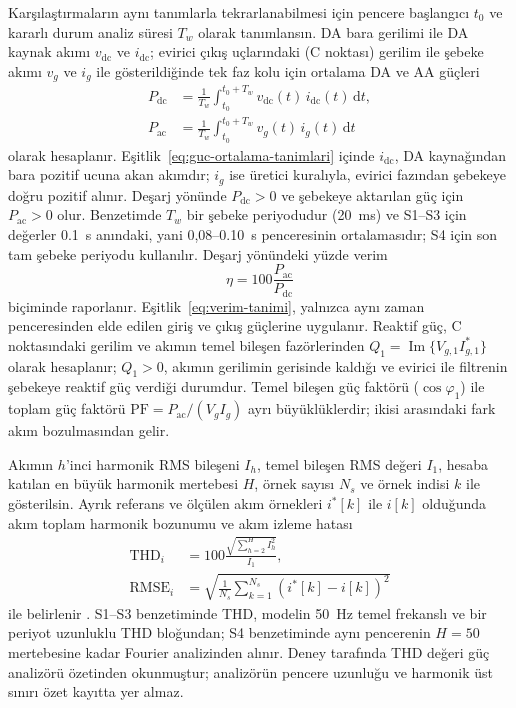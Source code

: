 Karşılaştırmaların aynı tanımlarla tekrarlanabilmesi için pencere başlangıcı $t_0$ ve kararlı durum analiz süresi $T_w$ olarak tanımlansın. DA bara gerilimi ile DA kaynak akımı $v_{\mathrm{dc}}$ ve $i_{\mathrm{dc}}$; evirici çıkış uçlarındaki (C noktası) gerilim ile şebeke akımı $v_g$ ve $i_g$ ile gösterildiğinde tek faz kolu için ortalama DA ve AA güçleri
\begin{equation}
  \begin{aligned}
    P_{\mathrm{dc}} &= \frac{1}{T_w}\int_{t_0}^{t_0+T_w}v_{\mathrm{dc}}(t)\,i_{\mathrm{dc}}(t)\,\mathrm{d}t, \\
    P_{\mathrm{ac}} &= \frac{1}{T_w}\int_{t_0}^{t_0+T_w}v_g(t)\,i_g(t)\,\mathrm{d}t
  \end{aligned}
  \label{eq:guc-ortalama-tanimlari}
\end{equation}
olarak hesaplanır. Eşitlik~\eqref{eq:guc-ortalama-tanimlari} içinde $i_{\mathrm{dc}}$, DA kaynağından bara pozitif ucuna akan akımdır; $i_g$ ise üretici kuralıyla, evirici fazından şebekeye doğru pozitif alınır. Deşarj yönünde $P_{\mathrm{dc}}>0$ ve şebekeye aktarılan güç için $P_{\mathrm{ac}}>0$ olur. Benzetimde $T_w$ bir şebeke periyodudur (\SI{20}{\milli\second}) ve S1--S3 için değerler \SI{0.1}{\second} anındaki, yani 0,08--\SI{0.10}{\second} penceresinin ortalamasıdır; S4 için son tam şebeke periyodu kullanılır. Deşarj yönündeki yüzde verim
\begin{equation}
  \eta=100\frac{P_{\mathrm{ac}}}{P_{\mathrm{dc}}}
  \label{eq:verim-tanimi}
\end{equation}
biçiminde raporlanır. Eşitlik~\eqref{eq:verim-tanimi}, yalnızca aynı zaman penceresinden elde edilen giriş ve çıkış güçlerine uygulanır. Reaktif güç, C noktasındaki gerilim ve akımın temel bileşen fazörlerinden $Q_1=\operatorname{Im}\{V_{g,1}I_{g,1}^{\ast}\}$ olarak hesaplanır; $Q_1>0$, akımın gerilimin gerisinde kaldığı ve evirici ile filtrenin şebekeye reaktif güç verdiği durumdur. Temel bileşen güç faktörü ($\cos\varphi_1$) ile toplam güç faktörü $\mathrm{PF}=P_{\mathrm{ac}}/(V_gI_g)$ ayrı büyüklüklerdir; ikisi arasındaki fark akım bozulmasından gelir.

Akımın $h$'inci harmonik RMS bileşeni $I_h$, temel bileşen RMS değeri $I_1$, hesaba katılan en büyük harmonik mertebesi $H$, örnek sayısı $N_s$ ve örnek indisi $k$ ile gösterilsin. Ayrık referans ve ölçülen akım örnekleri $i^{\ast}[k]$ ile $i[k]$ olduğunda akım toplam harmonik bozunumu ve akım izleme hatası
\begin{equation}
  \begin{aligned}
    \mathrm{THD}_i &=100\frac{\sqrt{\sum_{h=2}^{H}I_h^2}}{I_1}, \\
    \mathrm{RMSE}_i&=\sqrt{\frac{1}{N_s}\sum_{k=1}^{N_s}\left(i^{\ast}[k]-i[k]\right)^2}
  \end{aligned}
  \label{eq:thd-rmse-tanimlari}
\end{equation}
ile belirlenir \citep{Teodorescu2011,IEC61000}. S1--S3 benzetiminde THD, modelin \SI{50}{\hertz} temel frekanslı ve bir periyot uzunluklu THD bloğundan; S4 benzetiminde aynı pencerenin $H=50$ mertebesine kadar Fourier analizinden alınır. Deney tarafında THD değeri güç analizörü özetinden okunmuştur; analizörün pencere uzunluğu ve harmonik üst sınırı özet kayıtta yer almaz.

